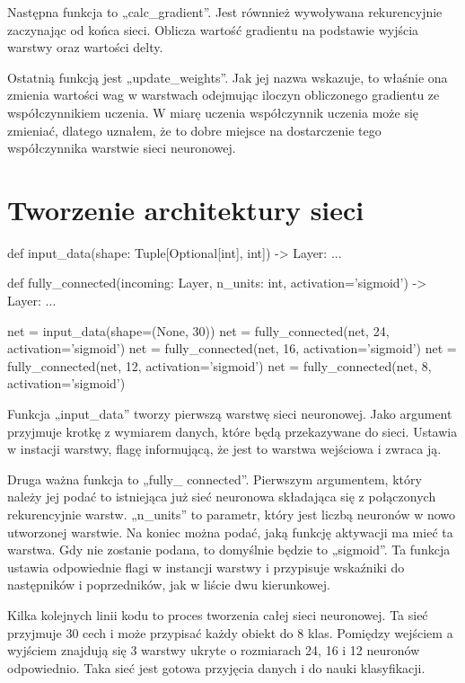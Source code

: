     Następna funkcja to „calc\_gradient”.
    Jest równnież wywoływana rekurencyjnie zaczynając od końca sieci.
    Oblicza wartość gradientu na podstawie wyjścia warstwy oraz wartości delty.

    Ostatnią funkcją jest „update\_weights”.
    Jak jej nazwa wskazuje, to właśnie ona zmienia wartości wag w warstwach odejmując iloczyn obliczonego gradientu ze współczynnikiem uczenia.
    W miarę uczenia współczynnik uczenia może się zmieniać, dlatego uznałem, że to dobre miejsce na dostarczenie tego współczynnika warstwie sieci neuronowej.

    \section{Tworzenie architektury sieci}\label{sec:tworzenieArchitekturySieci}

    \begin{python}[caption={Schemat tworzenia sieci}]
def input_data(shape: Tuple[Optional[int], int]) -> Layer:
    ...


def fully_connected(incoming: Layer, n_units: int,
                    activation='sigmoid') -> Layer:
    ...

net = input_data(shape=(None, 30))
net = fully_connected(net, 24, activation='sigmoid')
net = fully_connected(net, 16, activation='sigmoid')
net = fully_connected(net, 12, activation='sigmoid')
net = fully_connected(net, 8, activation='sigmoid')
    \end{python}

    Funkcja „input\_data” tworzy pierwszą warstwę sieci neuronowej.
    Jako argument przyjmuje krotkę z wymiarem danych, które będą przekazywane do sieci.
    Ustawia w instacji warstwy, flagę informującą, że jest to warstwa wejściowa i zwraca ją.

    Druga ważna funkcja to „fully\_ connected”.
    Pierwszym argumentem, który należy jej podać to istniejąca już sieć neuronowa składająca się z połączonych rekurencyjnie warstw.
    „n\_units” to parametr, który jest liczbą neuronów w nowo utworzonej warstwie.
    Na koniec można podać, jaką funkcję aktywacji ma mieć ta warstwa.
    Gdy nie zostanie podana, to domyślnie będzie to „sigmoid”.
    Ta funkcja ustawia odpowiednie flagi w instancji warstwy i przypisuje wskaźniki do następników i poprzedników, jak w liście dwu kierunkowej.

    Kilka kolejnych linii kodu to proces tworzenia całej sieci neuronowej.
    Ta sieć przyjmuje 30 cech i może przypisać każdy obiekt do 8 klas.
    Pomiędzy wejściem a wyjściem znajdują się 3 warstwy ukryte o rozmiarach 24, 16 i 12 neuronów odpowiednio.
    Taka sieć jest gotowa przyjęcia danych i do nauki klasyfikacji.

